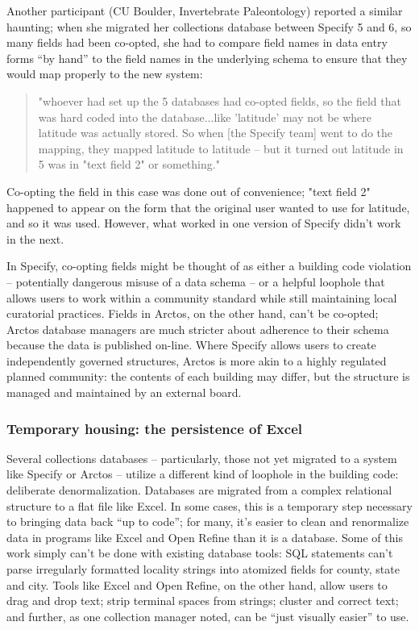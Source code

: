 Another participant (CU Boulder, Invertebrate Paleontology) reported a similar haunting; when she migrated her collections database between Specify 5 and 6, so many fields had been co-opted, she had to compare field names in data entry forms “by hand” to the field names in the underlying schema to ensure that they would map properly to the new system: 
\begin{quote}
"whoever had set up the 5 databases had co-opted fields, so the field that was hard coded into the database...like 'latitude' may not be where latitude was actually stored. So when [the Specify team] went to do the mapping, they mapped latitude to latitude -- but it turned out latitude in 5 was in "text field 2" or something." 
\end{quote}
Co-opting the field in this case was done out of convenience; "text field 2" happened to appear on the form that the original user wanted to use for latitude, and so it was used. However, what worked in one version of Specify didn't work in the next.

In Specify, co-opting fields might be thought of as either a building code violation -- potentially dangerous misuse of a data schema -- or a helpful loophole that allows users to work within a community standard while still maintaining local curatorial practices. Fields in Arctos, on the other hand, can't be co-opted; Arctos database managers are much stricter about adherence to their schema because the data is published on-line. Where Specify allows users to create independently governed structures, Arctos is more akin to a highly regulated planned community: the contents of each building may differ, but the structure is managed and maintained by an external board.

\subsubsection{Temporary housing: the persistence of Excel}

Several collections databases -- particularly, those not yet migrated to a system like Specify or Arctos -- utilize a different kind of loophole in the building code: deliberate denormalization. Databases are migrated from a complex relational structure to a flat file like Excel. In some cases, this is a temporary step necessary to bringing data back “up to code”; for many, it's easier to clean and renormalize data in programs like Excel and Open Refine than it is a database. Some of this work simply can’t be done with existing database tools: SQL statements can’t parse irregularly formatted locality strings into atomized fields for county, state and city. Tools like Excel and Open Refine, on the other hand, allow users to drag and drop text; strip terminal spaces from strings; cluster and correct text; and further, as one collection manager noted, can be “just visually easier” to use.


